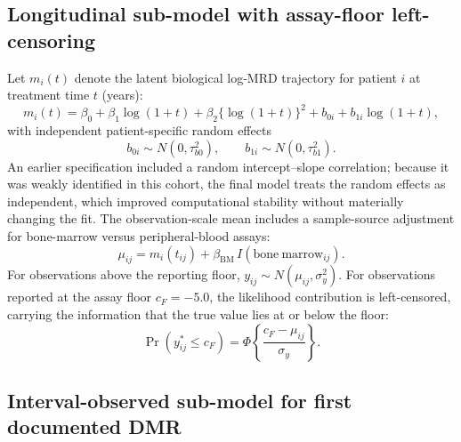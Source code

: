 \documentclass[11pt]{article}
\begin{document}
\subsection{Longitudinal sub-model with assay-floor left-censoring}
\label{sec:long}

Let $m_i(t)$ denote the latent biological log-MRD trajectory for patient
$i$ at treatment time $t$ (years):
\[
m_i(t)=\beta_0+\beta_1\log(1+t)+\beta_2\{\log(1+t)\}^2
+b_{0i}+b_{1i}\log(1+t),
\]
with independent patient-specific random effects
\[
b_{0i}\sim N(0,\tau_{b0}^2), \qquad b_{1i}\sim N(0,\tau_{b1}^2).
\]
An earlier specification included a random intercept--slope correlation;
because it was weakly identified in this cohort, the final model treats the
random effects as independent, which improved computational stability
without materially changing the fit. The observation-scale mean includes a
sample-source adjustment for bone-marrow versus peripheral-blood assays:
\[
\mu_{ij}=m_i(t_{ij})+\beta_{\mathrm{BM}}\,I(\mathrm{bone\ marrow}_{ij}).
\]
For observations above the reporting floor,
$y_{ij}\sim N(\mu_{ij},\sigma_y^2)$. For observations reported at the
assay floor $c_F=-5.0$, the likelihood contribution is left-censored,
carrying the information that the true value lies at or below the floor:
\[
\Pr(y_{ij}^{\ast}\le c_F)=
\Phi\!\left\{\frac{c_F-\mu_{ij}}{\sigma_y}\right\}.
\]

\subsection{Interval-observed sub-model for first documented DMR}
\label{sec:interval}
\end{document}
